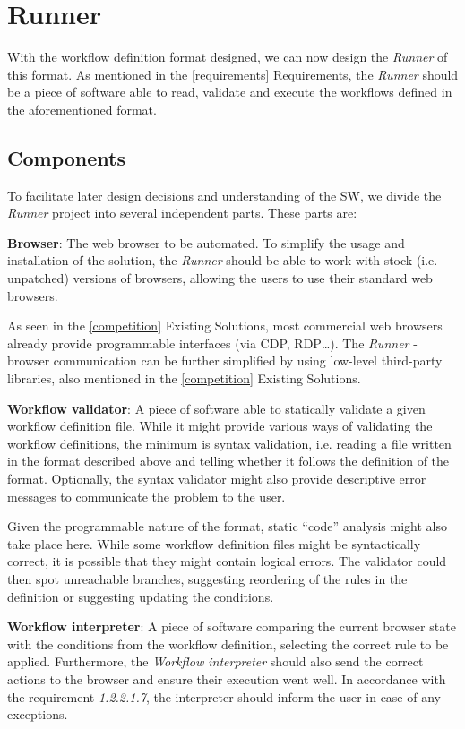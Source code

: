 \section{Runner}\label{runnerDesign}

With the workflow definition format designed, we can now design the \textit{Runner} of this format.
As mentioned in the \autoref{requirements} Requirements, the \textit{Runner} should be a piece of software able to read, validate and execute the workflows defined in the aforementioned format.

\subsection{Components}

To facilitate later design decisions and understanding of the \acl{SW}, we divide the \textit{Runner} project into several independent parts.
These parts are:

\emptyline
\textbf{Browser}:  
The web browser to be automated.
To simplify the usage and installation of the solution, the \textit{Runner} should be able to work with stock (i.e. unpatched) versions of browsers, allowing the users to use their standard web browsers.

As seen in the \autoref{competition} Existing Solutions, most commercial web browsers already provide programmable interfaces (via CDP, RDP\dots).
The \textit{Runner} - browser communication can be further simplified by using low-level third-party libraries, also mentioned in the \autoref{competition} Existing Solutions.

\emptyline
\textbf{Workflow validator}:
A piece of software able to statically validate a given workflow definition file.
While it might provide various ways of validating the workflow definitions, the minimum is syntax validation, i.e. reading a file written 
in the format described above and telling whether it follows the definition of the format.
Optionally, the syntax validator might also provide descriptive error messages to communicate the problem to the user.

Given the programmable nature of the format, static ``code'' analysis might also take place here. 
While some workflow definition files might be syntactically correct, it is possible that they might contain logical errors.
The validator could then spot unreachable branches, suggesting reordering of the rules in the definition or suggesting updating the conditions.

\emptyline
\textbf{Workflow interpreter}:  
A piece of software comparing the current browser state with the conditions from the workflow definition, selecting the correct rule to be applied.
Furthermore, the \textit{Workflow interpreter} should also send the correct actions to the browser and ensure their execution went well.
In accordance with the requirement \textit{1.2.2.1.7}, the interpreter should inform the user in case of any exceptions.

